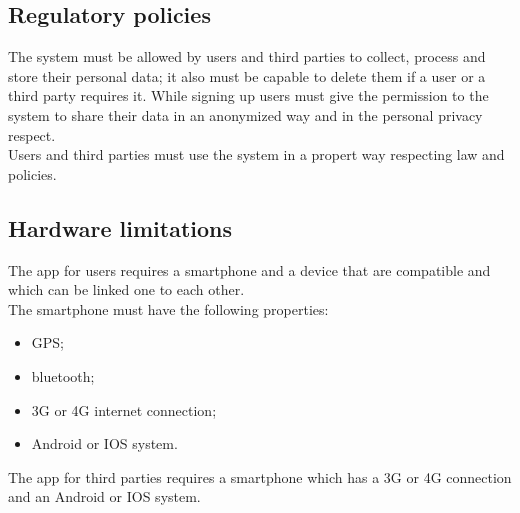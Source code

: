 \subsection{Regulatory policies}
The system must be allowed by users and third parties to collect, process and store their personal data; it also must be capable to delete them if a user or a third party requires it. While signing up users must give the permission to the system to share their data in an anonymized way and in the personal privacy respect.\\
Users and third parties must use the system in a propert way respecting law and policies.

\subsection{Hardware limitations}
The app for users requires a smartphone and a device that are compatible and which can be linked one to each other.\\
The smartphone must have the following properties:
\begin{itemize}
	\item GPS;
	\item bluetooth;
	\item 3G or 4G internet connection;
	\item Android or IOS system.

\end{itemize}The app for third parties requires a smartphone which has a 3G or 4G connection and an Android or IOS system.
